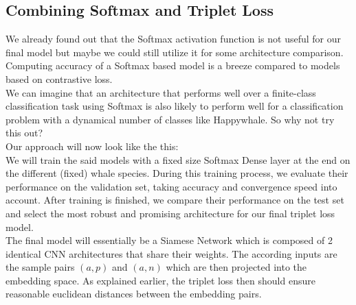 \subsection{Combining Softmax and Triplet Loss}
We already found out that the Softmax activation function is not useful for our final model but maybe we could still utilize it for some architecture comparison. Computing accuracy of a Softmax based model is a breeze compared to models based on contrastive loss. \\
We can imagine that an architecture that performs well over a finite-class classification task using Softmax is also likely to perform well for a classification problem with a dynamical number of classes like Happywhale. So why not try this out? \\
Our approach will now look like the this: \\
We will train the said models with a fixed size Softmax Dense layer at the end on the different (fixed) whale species. During this training process, we evaluate their performance on the validation set, taking accuracy and convergence speed into account. After training is finished, we compare their performance on the test set and select the most robust and promising architecture for our final triplet loss model.\\

\noindent The final model will essentially be a Siamese Network which is composed of 2 identical CNN architectures that share their weights. The according inputs are the sample pairs \((a,p)\) and \((a,n)\) which are then projected into the embedding space. As explained earlier, the triplet loss then should ensure reasonable euclidean distances between the embedding pairs.

